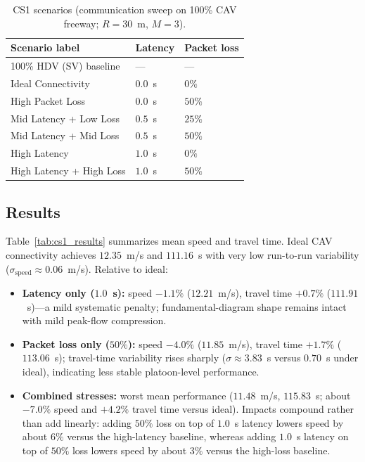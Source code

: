 \documentclass[numbered]{trbunofficial}
\begin{document}
\begin{table}[htbp]
  \centering
  \caption{CS1 scenarios (communication sweep on 100\% CAV freeway; $R{=}30$~m, $M{=}3$).}
  \label{tab:cs1_scen}
  \small
  \begin{tabular}{@{}lll@{}}
    \toprule
    Scenario label & Latency & Packet loss \\
    \midrule
    100\% HDV (SV) baseline & --- & --- \\
    Ideal Connectivity & $0.0$~s & $0\%$ \\
    High Packet Loss & $0.0$~s & $50\%$ \\
    Mid Latency + Low Loss & $0.5$~s & $25\%$ \\
    Mid Latency + Mid Loss & $0.5$~s & $50\%$ \\
    High Latency & $1.0$~s & $0\%$ \\
    High Latency + High Loss & $1.0$~s & $50\%$ \\
    \bottomrule
  \end{tabular}
\end{table}

\subsection{Results}
Table~\ref{tab:cs1_results} summarizes mean speed and travel time. Ideal CAV connectivity
achieves $12.35$~m/s and $111.16$~s with very low run-to-run variability
($\sigma_{\mathrm{speed}}\approx 0.06$~m/s). Relative to ideal:

\begin{itemize}
  \item \textbf{Latency only ($1.0$~s):} speed $-1.1\%$ ($12.21$~m/s), travel time $+0.7\%$
        ($111.91$~s)---a mild systematic penalty; fundamental-diagram shape remains intact with
        mild peak-flow compression.
  \item \textbf{Packet loss only ($50\%$):} speed $-4.0\%$ ($11.85$~m/s), travel time $+1.7\%$
        ($113.06$~s); travel-time variability rises sharply
        ($\sigma\approx 3.83$~s versus $0.70$~s under ideal), indicating less stable
        platoon-level performance.
  \item \textbf{Combined stresses:} worst mean performance ($11.48$~m/s, $115.83$~s; about
        $-7.0\%$ speed and $+4.2\%$ travel time versus ideal). Impacts compound rather than
        add linearly: adding $50\%$ loss on top of $1.0$~s latency lowers speed by about
        $6\%$ versus the high-latency baseline, whereas adding $1.0$~s latency on top of
        $50\%$ loss lowers speed by about $3\%$ versus the high-loss baseline.
\end{itemize}
\end{document}
